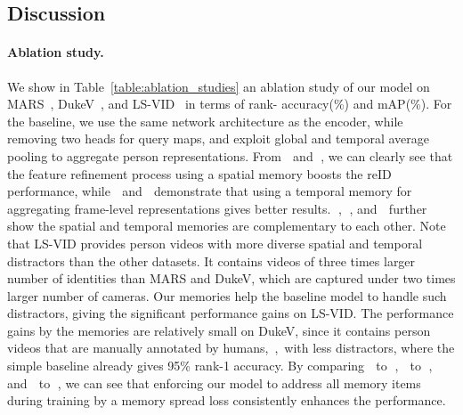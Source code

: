 \documentclass[10pt,twocolumn,letterpaper]{article}
\begin{document}
		
	\subsection{Discussion} \label{subsec:discussion}
	\vspace{-0.1cm}
	
		\paragraph{Ablation study.}

			We show in Table~\ref{table:ablation_studies} an ablation study of our model on MARS~\cite{zheng2016mars}, DukeV~\cite{wu2018exploit}, and LS-VID~\cite{li2019global} in terms of rank- accuracy(\%) and mAP(\%). For the baseline, we use the same network architecture as the encoder, while removing two heads for query maps, and exploit global and temporal average pooling to aggregate person representations. From \textcircled{\raisebox{-0.9pt}{1}} and \textcircled{\raisebox{-0.9pt}{3}}, we can clearly see that the feature refinement process using a spatial memory boosts the reID performance, while \textcircled{\raisebox{-0.9pt}{1}} and \textcircled{\raisebox{-0.9pt}{5}} demonstrate that using a temporal memory for aggregating frame-level representations gives better results. \textcircled{\raisebox{-0.9pt}{3}}, \textcircled{\raisebox{-0.9pt}{5}}, and \textcircled{\raisebox{-0.9pt}{7}} further show the spatial and temporal memories are complementary to each other. Note that LS-VID provides person videos with more diverse spatial and temporal distractors than the other datasets. It contains videos of three times larger number of identities than MARS and DukeV, which are captured under two times larger number of cameras. Our memories help the baseline model to handle such distractors, giving the significant performance gains on LS-VID. The performance gains by the memories are relatively small on DukeV, since it contains person videos that are manually annotated by humans,~\ie,~with less distractors, where the simple baseline already gives 95\% rank-1 accuracy. By comparing \textcircled{\raisebox{-0.9pt}{2}} to \textcircled{\raisebox{-0.9pt}{3}}, \textcircled{\raisebox{-0.9pt}{4}} to \textcircled{\raisebox{-0.9pt}{5}}, and \textcircled{\raisebox{-0.9pt}{6}} to \textcircled{\raisebox{-0.9pt}{7}}, we can see that enforcing our model to address all memory items during training by a memory spread loss consistently enhances the performance.
						
\end{document}
